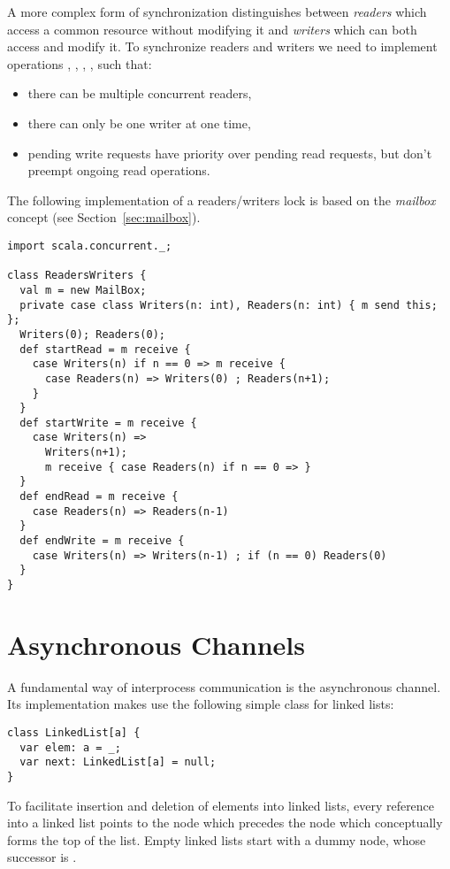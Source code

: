 {A more complex form of synchronization distinguishes between {\em
readers} which access a common resource without modifying it and {\em
writers} which can both access and modify it. To synchronize readers
and writers we need to implement operations , ,
, , such that:
\begin{itemize}
\item there can be multiple concurrent readers,
\item there can only be one writer at one time,
\item pending write requests have priority over pending read requests,
but don't preempt ongoing read operations.
\end{itemize}
The following implementation of a readers/writers lock is based on the
{\em mailbox} concept (see Section~\ref{sec:mailbox}).

\begin{lstlisting}
import scala.concurrent._;

class ReadersWriters {
  val m = new MailBox;
  private case class Writers(n: int), Readers(n: int) { m send this; };
  Writers(0); Readers(0);
  def startRead = m receive {
    case Writers(n) if n == 0 => m receive {
      case Readers(n) => Writers(0) ; Readers(n+1);
    }
  }
  def startWrite = m receive {
    case Writers(n) =>
      Writers(n+1);
      m receive { case Readers(n) if n == 0 => }
  }
  def endRead = m receive {
    case Readers(n) => Readers(n-1)
  }
  def endWrite = m receive {
    case Writers(n) => Writers(n-1) ; if (n == 0) Readers(0)
  }
}
\end{lstlisting}

\section{Asynchronous Channels}

A fundamental way of interprocess communication is the asynchronous
channel. Its implementation makes use the following simple class for linked
lists:
\begin{lstlisting}
class LinkedList[a] {
  var elem: a = _;
  var next: LinkedList[a] = null;
}
\end{lstlisting}
To facilitate insertion and deletion of elements into linked lists,
every reference into a linked list points to the node which precedes
the node which conceptually forms the top of the list.
Empty linked lists start with a dummy node, whose successor is .

}
